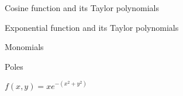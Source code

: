 \begin{figure}[h]
\centering
\caption{Cosine function and its Taylor polynomials}
\label{Fig:TaylorExpansionCosine}
\pgfplotsset{width=19cm,height=6cm}

\end{figure}

\begin{figure}[h]
\centering
\caption{Exponential function and its Taylor polynomials}
\label{Fig:TaylorExpansionExp}
\pgfplotsset{width=15cm,height=10cm}

\end{figure}



\begin{figure}[h]
\centering
\caption{Monomials}
\label{Fig:MultiplotMonomials}
\pgfplotsset{width=7cm}

\end{figure}


\begin{figure}[h]
\centering
\caption{Poles}
\label{Fig:MultiplotPoles}
\pgfplotsset{width=7cm}

\end{figure}



\begin{figure}[h]
\centering
\caption{$f(x,y) = x e^{-(x^2+y^2)}$}
\label{Fig:BivariateGaussian3D}
\pgfplotsset{width=16cm,height=10cm}

\end{figure}


